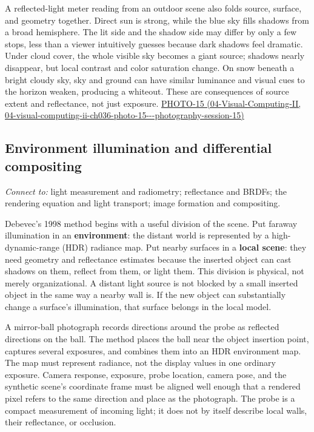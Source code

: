 A reflected-light meter reading from an outdoor scene also folds source, surface, and geometry together. Direct sun is strong, while the blue sky fills shadows from a broad hemisphere. The lit side and the shadow side may differ by only a few stops, less than a viewer intuitively guesses because dark shadows feel dramatic. Under cloud cover, the whole visible sky becomes a giant source; shadows nearly disappear, but local contrast and color saturation change. On snow beneath a bright cloudy sky, sky and ground can have similar luminance and visual cues to the horizon weaken, producing a whiteout. These are consequences of source extent and reflectance, not just exposure. \href{../04-Visual-Computing-II/main.pdf\#nameddest=04-visual-computing-ii-ch036-photo-15---photography-session-15}{PHOTO-15 (04-Visual-Computing-II, 04-visual-computing-ii-ch036-photo-15-\/-\/-photography-session-15)}

\subsection{Environment illumination and differential compositing}\label{03-visual-computing-i-ch004-environment-illumination-and-differential-compositing}

\emph{Connect to:} light measurement and radiometry; reflectance and BRDFs; the rendering equation and light transport; image formation and compositing.

Debevec's 1998 method begins with a useful division of the scene. Put faraway illumination in an \textbf{environment}: the distant world is represented by a high-dynamic-range (HDR) radiance map. Put nearby surfaces in a \textbf{local scene}: they need geometry and reflectance estimates because the inserted object can cast shadows on them, reflect from them, or light them. This division is physical, not merely organizational. A distant light source is not blocked by a small inserted object in the same way a nearby wall is. If the new object can substantially change a surface's illumination, that surface belongs in the local model.

A mirror-ball photograph records directions around the probe as reflected directions on the ball. The method places the ball near the object insertion point, captures several exposures, and combines them into an HDR environment map. The map must represent radiance, not the display values in one ordinary exposure. Camera response, exposure, probe location, camera pose, and the synthetic scene's coordinate frame must be aligned well enough that a rendered pixel refers to the same direction and place as the photograph. The probe is a compact measurement of incoming light; it does not by itself describe local walls, their reflectance, or occlusion.

